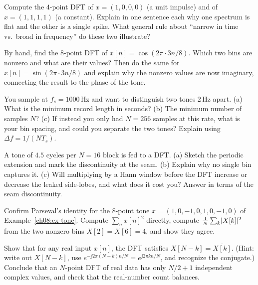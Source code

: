 \begin{exercise}
Compute the $4$-point DFT of $x = (1,0,0,0)$ (a unit impulse) and of $x =
(1,1,1,1)$ (a constant). Explain in one sentence each why one spectrum is flat and
the other is a single spike. What general rule about ``narrow in time vs.\ broad in
frequency'' do these two illustrate?
\end{exercise}

\begin{exercise}
By hand, find the $8$-point DFT of $x[n] = \cos(2\pi \cdot 3 n / 8)$. Which two
bins are nonzero and what are their values? Then do the same for
$x[n] = \sin(2\pi \cdot 3 n/8)$ and explain why the nonzero values are now
imaginary, connecting the result to the phase of the tone.
\end{exercise}

\begin{exercise}
You sample at $f_s = 1000$\,Hz and want to distinguish two tones $2$\,Hz apart.
(a) What is the minimum record length in seconds? (b) The minimum number of
samples $N$? (c) If instead you only had $N=256$ samples at this rate, what is your
bin spacing, and could you separate the two tones? Explain using
$\Delta f = 1/(NT_s)$.
\end{exercise}

\begin{exercise}
A tone of $4.5$ cycles per $N=16$ block is fed to a DFT. (a) Sketch the periodic
extension and mark the discontinuity at the seam. (b) Explain why no single bin
captures it. (c) Will multiplying by a Hann window before the DFT increase or
decrease the leaked side-lobes, and what does it cost you? Answer in terms of the
seam discontinuity.
\end{exercise}

\begin{exercise}
Confirm Parseval's identity for the $8$-point tone $x = (1,0,-1,0,1,0,-1,0)$ of
Example~\ref{ch08:ex-tone}. Compute $\sum_n x[n]^2$ directly, compute
$\frac{1}{N}\sum_k \lvert X[k]\rvert^2$ from the two nonzero bins $X[2]=X[6]=4$, and show
they agree.
\end{exercise}

\begin{exercise}
Show that for any real input $x[n]$, the DFT satisfies $X[N-k] =
\overline{X[k]}$. (Hint: write out $X[N-k]$, use $e^{-\jj 2\pi (N-k)n/N} =
e^{\jj 2\pi k n/N}$, and recognize the conjugate.) Conclude that an $N$-point DFT
of real data has only $N/2 + 1$ independent complex values, and check that the
real-number count balances.
\end{exercise}

